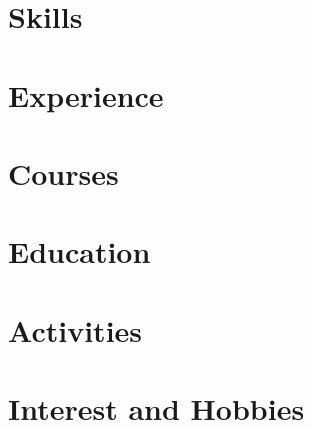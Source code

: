 \documentclass[letter,10pt]{article}
\begin{document}


\section{Skills}


\section{Experience}


\section{Courses}


\section{Education}



\section{Activities}


\section{Interest and Hobbies}

\end{document}

